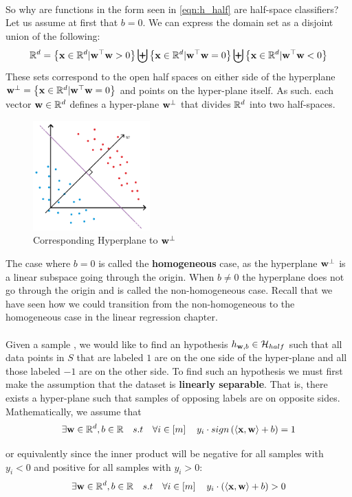 ~\\So why are functions in the form seen in \ref{eqn:h_half} are half-space classifiers? Let us assume at first that $b=0$. We can express the domain set as a disjoint union of the following:
$$ \mathbb{R}^d=\left\{\mathbf{x}\in\mathbb{R}^d | \mathbf{w}^\top \mathbf{w}>0\right\} \biguplus \left\{\mathbf{x}\in\mathbb{R}^d | \mathbf{w}^\top \mathbf{w}=0\right\} \biguplus \left\{\mathbf{x}\in\mathbb{R}^d | \mathbf{w}^\top \mathbf{w}<0\right\} $$
These sets correspond to the open half spaces on either side of the hyperplane $\mathbf{w}^\perp=\left\{\mathbf{x}\in\mathbb{R}^d|\mathbf{w}^\top \mathbf{w}=0\right\}$ and points on the hyper-plane itself. As such. each vector $\mathbf{w}\in\mathbb{R}^d$ defines a hyper-plane $\mathbf{w}^\perp$ that divides $\mathbb{R}^d$ into two half-spaces.

\begin{figure}[h!]
	\centering
	\includegraphics[width=0.4\textwidth]{chapters/classification/figures/3_2.png}
	\caption{Corresponding Hyperplane to $\mathbf{w}^\perp$}
\end{figure}

The case where $b=0$ is called the \textbf{homogeneous} case, as the hyperplane $\mathbf{w}^\perp$ is a linear subspace going through the origin. When $b\neq 0$ the hyperplane does not go through the origin and is called the non-homogeneous case. Recall that we have seen how we could transition from the non-homogeneous to the homogeneous case in the linear regression chapter.
\\~\\
Given a sample \trainset, we would like to find an hypothesis $h_{\mathbf{w},b}\in\mathcal{H}_{half}$ such that all data points in $S$ that are labeled $1$ are on the one side of the hyper-plane and all those labeled $-1$ are on the other side. To find such an hypothesis we must first make the assumption that the dataset is \textbf{linearly separable}. That is, there exists a hyper-plane such that samples of opposing labels are on opposite sides. Mathematically, we assume that $$ \exists \mathbf{w}\in\mathbb{R}^d,b\in\mathbb{R}\quad s.t\quad \forall i\in\left[m\right] \quad y_i\cdot sign \left(\left\langle \mathbf{x},\mathbf{w}\right\rangle + b\right)=1$$

or equivalently since the inner product will be negative for all samples with $y_i<0$ and positive for all samples with $y_i>0$:
$$ \exists \mathbf{w}\in\mathbb{R}^d,b\in\mathbb{R}\quad s.t\quad \forall i\in\left[m\right] \quad y_i\cdot \left(\left\langle \mathbf{x},\mathbf{w}\right\rangle + b\right)>0$$

